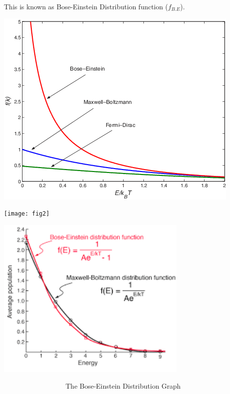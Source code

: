 \documentclass[12pt, letterpaper]{article}
\begin{document}
    This is known as Bose-Einstein Distribution function ($f_{B.E}$).

    \begin{adjustbox}{center,caption={},label={somelabel},nofloat=figure,vspace=\bigskipamount}
        \includegraphics[width=\textwidth]{fig1}
    \end{adjustbox} 

    \newpage

    \begin{adjustbox}{center,caption={},label={somelabel},nofloat=figure,vspace=\bigskipamount}
        \texttt{[image: fig2]}
    \end{adjustbox}
    
    \begin{adjustbox}{center,caption={},label={somelabel},nofloat=figure,vspace=\bigskipamount}
        \includegraphics[width=0.7\textwidth]{fig3}
    \end{adjustbox}
     \ \ \ \ \ \ \ \ \ \ \  \ \ \ \ \ \ \  The Bose-Einstein Distribution Graph
\end{document}
